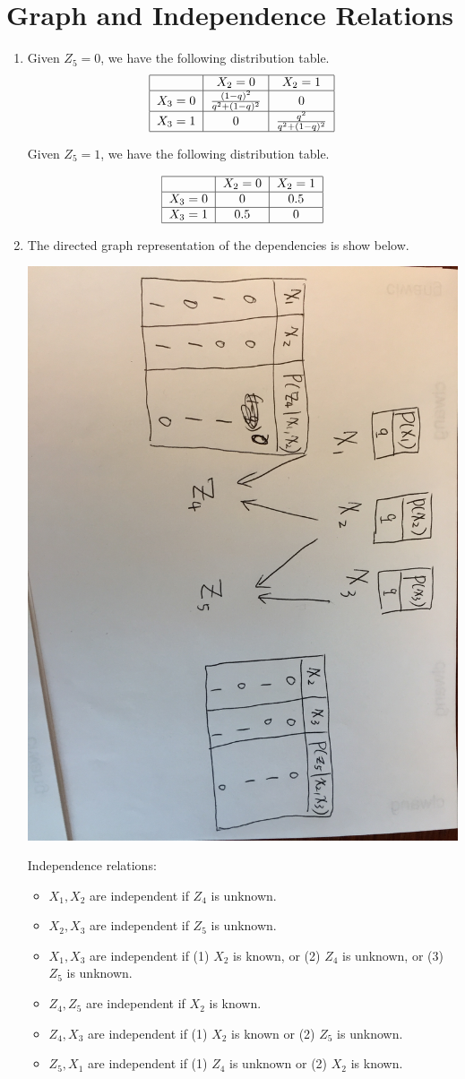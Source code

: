\documentclass[notitlepage]{article}
\begin{document}
\section{Graph and Independence Relations}

\begin{enumerate}
\item Given $Z_5=0$, we have the following distribution table.
\[
\begin{tabular}{|c|c|c|}
\hline
 & $X_2 = 0$ & $X_2 = 1$\\\hline
$X_3 = 0$& $\frac{(1-q)^2}{q^2+(1-q)^2}$ & 0\\\hline
$X_3 = 1$& 0& $\frac{q^2}{q^2+(1-q)^2}$ \\\hline
\end{tabular}
\]

Given $Z_5=1$, we have the following distribution table.

\[
\begin{tabular}{|c|c|c|}
\hline
 & $X_2 = 0$ & $X_2 = 1$\\\hline
$X_3 = 0$ & 0 & 0.5\\\hline
$X_3 = 1$ & 0.5 & 0 \\\hline
\end{tabular}
\]

\item The directed graph representation of the dependencies is show below.

\includegraphics[width=0.5\columnwidth]{directed.jpg}

Independence relations: 

\begin{itemize}
\item $X_1, X_2$ are independent if $Z_4$ is unknown.
\item $X_2, X_3$ are independent if $Z_5$ is unknown.
\item $X_1, X_3$ are independent if (1) $X_2$ is known, or (2) $Z_4$ is unknown, or (3) $Z_5$ is unknown.
\item $Z_4, Z_5$ are independent if $X_2$ is known.
\item $Z_4, X_3$ are independent if (1) $X_2$ is known or (2) $Z_5$ is unknown.
\item $Z_5, X_1$ are independent if (1) $Z_4$ is unknown or (2) $X_2$ is known.
\end{itemize}


\end{enumerate}
\end{document}
